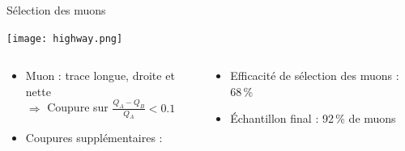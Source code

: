     \begin{frame}{Sélection des muons}
        \begin{scriptsize}
        \texttt{[image: highway.png]}
        \begin{columns}
            \begin{column}{0.5\textwidth}
                \begin{itemize}
                    \item Muon : trace longue, droite et nette \\ $\Rightarrow$ Coupure sur $\frac{Q_A-Q_B}{Q_A} < 0.1$
                    \item Coupures supplémentaires : \begin{itemize}\end{itemize}
                \end{itemize}
            \end{column}
            \begin{column}{0.5\textwidth}
                \begin{itemize}
                    \item Efficacité de sélection des muons : 68\,\%
                    \item Échantillon final : 92\,\% de muons
                \end{itemize}
            \end{column}
        \end{columns}
        \end{scriptsize}
    \end{frame}
    
